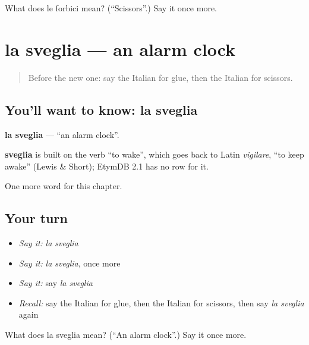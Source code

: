 \begin{tcolorbox}[breakable,colback=teal!4,colframe=teal!35!black,title={Before you move on}]
What does le forbici mean? (\textquotedblleft{}Scissors\textquotedblright{}.) Say it once more.
\end{tcolorbox}
\section[la sveglia]{la sveglia — an alarm clock}

\label{lesson:IT-C100-sveglia}



\begin{quote}
Before the new one: say the Italian for glue, then the Italian for scissors.
\end{quote}

\subsection*{You'll want to know: la sveglia}
\textbf{la sveglia} — \textquotedblleft{}an alarm clock\textquotedblright{}.

\begin{cousinweb}
\textbf{sveglia} is built on the verb \textquotedblleft{}to wake\textquotedblright{}, which goes back to Latin \emph{vigilare}, \textquotedblleft{}to keep awake\textquotedblright{} (Lewis \& Short); EtymDB 2.1 has no row for it.
\end{cousinweb}

\begin{grammarlens}[title={What you've built}]
One more word for this chapter.
\end{grammarlens}

\subsection*{Your turn}
\begin{itemize}
\raggedright
  \item \emph{Say it:} \emph{la sveglia}
  \item \emph{Say it:} \emph{la sveglia}, once more
  \item \emph{Say it:} say \emph{la sveglia}
  \item \emph{Recall:} say the Italian for glue, then the Italian for scissors, then say \emph{la sveglia} again
\end{itemize}

\begin{tcolorbox}[breakable,colback=teal!4,colframe=teal!35!black,title={Before you move on}]
What does la sveglia mean? (\textquotedblleft{}An alarm clock\textquotedblright{}.) Say it once more.
\end{tcolorbox}
